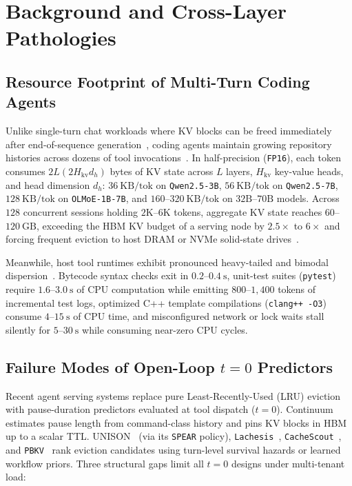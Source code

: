 \documentclass[10pt,journal,compsoc]{IEEEtran}
\theoremstyle{definition}
\theoremstyle{remark}
\newcommand{\Continuum}{\textup{\textsc{Continuum}}}
\newcommand{\UNISON}{\textup{\textsc{UNISON}}}
\def\Continuum{Continuum}%
\def\UNISON{UNISON}%
\begin{document}
\section{Background and Cross-Layer Pathologies}\label{sec:motivation}

\subsection{Resource Footprint of Multi-Turn Coding Agents}
Unlike single-turn chat workloads where KV blocks can be freed immediately after end-of-sequence generation~\cite{kwon2023vllm}, coding agents maintain growing repository histories across dozens of tool invocations~\cite{yang2024sweagent,wang2025openhands}. In half-precision (\texttt{FP16}), each token consumes $2 L (2 H_{\mathrm{kv}} d_h)$ bytes of KV state across $L$ layers, $H_{\mathrm{kv}}$ key-value heads, and head dimension $d_h$: $36~\mathrm{KB/tok}$ on \texttt{Qwen2.5-3B}, $56~\mathrm{KB/tok}$ on \texttt{Qwen2.5-7B}, $128~\mathrm{KB/tok}$ on \texttt{OLMoE-1B-7B}, and $160$--$320~\mathrm{KB/tok}$ on $32\mathrm{B}$--$70\mathrm{B}$ models. Across $128$ concurrent sessions holding $2\mathrm{K}$--$6\mathrm{K}$ tokens, aggregate KV state reaches $60$--$120~\mathrm{GB}$, exceeding the HBM KV budget of a serving node by $2.5\times$ to $6\times$ and forcing frequent eviction to host DRAM or NVMe solid-state drives~\cite{gao2024cachedattention,qin2025mooncake,cheng2025lmcache}.

Meanwhile, host tool runtimes exhibit pronounced heavy-tailed and bimodal dispersion~\cite{harcholbalter1997exploiting,li2025continuum}. Bytecode syntax checks exit in $0.2$--$0.4~\mathrm{s}$, unit-test suites (\texttt{pytest}) require $1.6$--$3.0~\mathrm{s}$ of CPU computation while emitting $800$--$1{,}400$ tokens of incremental test logs, optimized C++ template compilations (\texttt{clang++ -O3}) consume $4$--$15~\mathrm{s}$ of CPU time, and misconfigured network or lock waits stall silently for $5$--$30~\mathrm{s}$ while consuming near-zero CPU cycles.

\subsection{Failure Modes of Open-Loop $t=0$ Predictors}
Recent agent serving systems replace pure Least-Recently-Used (LRU) eviction with pause-duration predictors evaluated at tool dispatch ($t = 0$). \Continuum{}~\cite{li2025continuum} estimates pause length from command-class history and pins KV blocks in HBM up to a scalar TTL. \UNISON{}~\cite{he2026unison} (via its \texttt{SPEAR} policy), \texttt{Lachesis}~\cite{yang2026lachesis}, \texttt{CacheScout}~\cite{zhang2026cachescout}, and \texttt{PBKV}~\cite{zheng2026pbkv} rank eviction candidates using turn-level survival hazards or learned workflow priors. Three structural gaps limit all $t=0$ designs under multi-tenant load:
\end{document}
